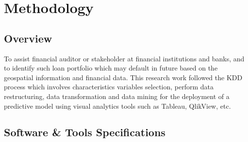 %
%
%
%

\chapter{Methodology}\label{C.Methodology}

\section{Overview}\label{S.Ch4.opening}
To assist financial auditor or stakeholder at financial institutions and banks, and to identify such loan portfolio which may default in future based on the geospatial information and financial data. This research work followed the KDD process which involves characteristics variables selection, perform data restructuring, data transformation and data mining for the deployment of a predictive model using visual analytics tools such as Tableau, QlikView, etc.


\section{Software \& Tools Specifications}\label{ch4.2}

